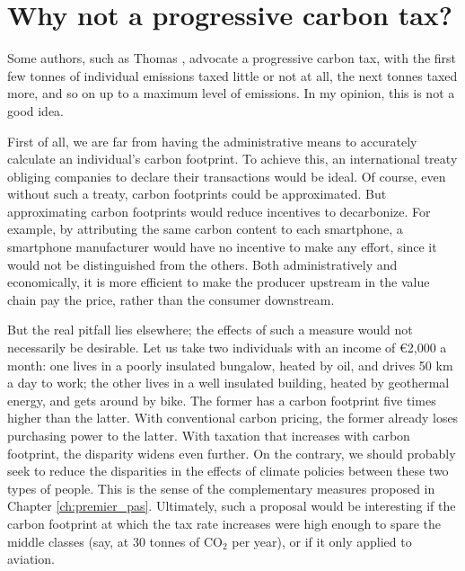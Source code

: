 \documentclass[a5paper,english,openany]{memoir}
\begin{document}
\section*{\normalsize Why not a progressive carbon tax?}\label{q:taxe_progressive}

Some authors, such as Thomas \cite{piketty_capital_2019}, advocate a progressive carbon tax, with the first few tonnes of individual emissions taxed little or not at all, the next tonnes taxed more, and so on up to a maximum level of emissions. In my opinion, this is not a good idea. %

First of all, we are far from having the administrative means to accurately calculate an individual's carbon footprint. To achieve this, an international treaty obliging companies to declare their transactions would be ideal. Of course, even without such a treaty, carbon footprints could be approximated. But approximating carbon footprints would reduce incentives to decarbonize. %
For example, by attributing the same carbon content to each smartphone, a smartphone manufacturer would have no incentive to make any effort, since it would not be distinguished from the others. Both administratively and economically, it is more efficient to make the producer upstream in the value chain pay the price, rather than the consumer downstream. 

But the real pitfall lies elsewhere; %
the effects of such a measure would not necessarily be desirable. Let us %
take two individuals with an income of \euro{}2,000 a month: one lives in a poorly insulated bungalow, heated by oil, and drives 50 km a day to work; the other lives in a well insulated building, heated by geothermal energy, and gets around by bike. The former has a carbon footprint five times higher than the latter. With conventional carbon pricing, the former already loses purchasing power to the latter. With taxation that increases with carbon footprint, the disparity widens even further. On the contrary, we should probably seek to reduce the disparities in the effects of climate policies between these two types of people. This is the sense of the complementary measures proposed in Chapter \ref{ch:premier_pas}. %
Ultimately, such a proposal would be interesting if the carbon footprint at which the tax rate increases were high enough to spare the middle classes (say, at 30 tonnes of CO$_\text{2}$ per year), or if it only applied to aviation. %
\end{document}

